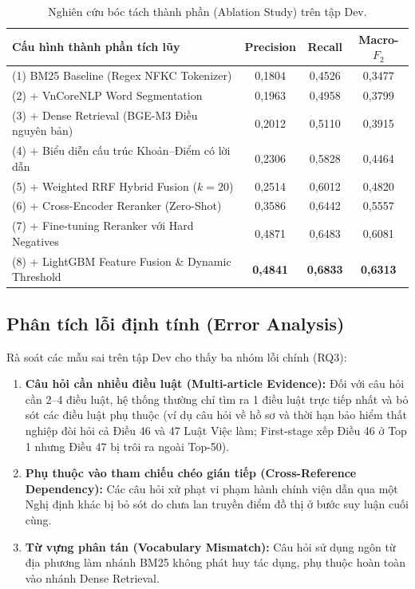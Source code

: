 \documentclass[12pt,a4paper]{article}
\begin{document}
\begin{table}[htbp]
\centering
\caption{Nghiên cứu bóc tách thành phần (Ablation Study) trên tập Dev.}
\label{tab:ablation}
\footnotesize
\begin{tabularx}{\textwidth}{X c c c}
\toprule
\textbf{Cấu hình thành phần tích lũy} & \textbf{Precision} & \textbf{Recall} & \textbf{Macro-$F_2$} \\
\midrule
(1) BM25 Baseline (Regex NFKC Tokenizer) & 0,1804 & 0,4526 & 0,3477 \\
(2) + VnCoreNLP Word Segmentation & 0,1963 & 0,4958 & 0,3799 \\
(3) + Dense Retrieval (BGE-M3 Điều nguyên bản) & 0,2012 & 0,5110 & 0,3915 \\
(4) + Biểu diễn cấu trúc Khoản--Điểm có lời dẫn & 0,2306 & 0,5828 & 0,4464 \\
(5) + Weighted RRF Hybrid Fusion ($k=20$) & 0,2514 & 0,6012 & 0,4820 \\
(6) + Cross-Encoder Reranker (Zero-Shot) & 0,3586 & 0,6442 & 0,5557 \\
(7) + Fine-tuning Reranker với Hard Negatives & 0,4871 & 0,6483 & 0,6081 \\
(8) + LightGBM Feature Fusion \& Dynamic Threshold & \textbf{0,4841} & \textbf{0,6833} & \textbf{0,6313} \\
\bottomrule
\end{tabularx}
\end{table}

\subsection{Phân tích lỗi định tính (Error Analysis)}
Rà soát các mẫu sai trên tập Dev cho thấy ba nhóm lỗi chính (RQ3):
\begin{enumerate}[leftmargin=0.7cm]
    \item \textbf{Câu hỏi cần nhiều điều luật (Multi-article Evidence):} Đối với câu hỏi cần 2--4 điều luật, hệ thống thường chỉ tìm ra 1 điều luật trực tiếp nhất và bỏ sót các điều luật phụ thuộc (ví dụ câu hỏi về hồ sơ và thời hạn bảo hiểm thất nghiệp đòi hỏi cả Điều 46 và 47 Luật Việc làm; First-stage xếp Điều 46 ở Top 1 nhưng Điều 47 bị trôi ra ngoài Top-50).
    \item \textbf{Phụ thuộc vào tham chiếu chéo gián tiếp (Cross-Reference Dependency):} Các câu hỏi xử phạt vi phạm hành chính viện dẫn qua một Nghị định khác bị bỏ sót do chưa lan truyền điểm đồ thị ở bước suy luận cuối cùng.
    \item \textbf{Từ vựng phân tán (Vocabulary Mismatch):} Câu hỏi sử dụng ngôn từ địa phương làm nhánh BM25 không phát huy tác dụng, phụ thuộc hoàn toàn vào nhánh Dense Retrieval.
\end{enumerate}
\end{document}
